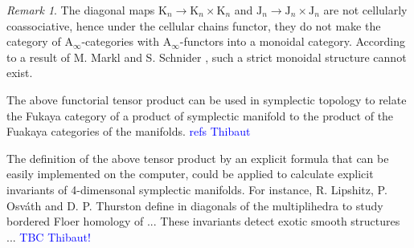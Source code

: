 \documentclass[twoside, 12pt]{amsart}
\theoremstyle{remark}
\newtheorem{remark}[definition]{\sc Remark}
\newcommand{\K}{\mathrm{K}}
\newcommand{\J}{\mathrm{J}}
\newcommand{\TreeLa}
{\vcenter{\hbox{
\begin{tikzpicture}[scale=0.25]
\draw[very thick, MidnightBlue] (0,-0.5)--(0,0) -- (-2,2)--(-2,2.5);
\draw[very thick, MidnightBlue] (-1,1)--(0,2)--(0,2.5) ;
\draw[very thick, MidnightBlue] (0,0)--(1,1)--(1,2.5) ;
%
\draw[very thick, BrickRed] (0,-0.5)--(0,-1) ;
%
\draw (-0.5,-0.5) --(0.5, -0.5);
\end{tikzpicture}}}}
\newcommand{\TreeLb}
{\vcenter{\hbox{
\begin{tikzpicture}[scale=0.25]
\draw[very thick, MidnightBlue] (-0.5,0.5)--(-2,2)--(-2,2.5);
\draw[very thick, MidnightBlue] (-1,1)--(0,2)--(0,2.5) ;
\draw[very thick, MidnightBlue] (0.5,0.5)--(1,1)--(1,2.5) ;
%
\draw[very thick, BrickRed] (0,0)--(0,-0.5) ;
\draw[very thick, BrickRed] (0,0)--(-0.5, 0.5) ;
\draw[very thick, BrickRed] (0,0)--(0.5,0.5) ;
%
\draw (-1,0.5) --(1, 0.5);
\end{tikzpicture}}}}
\newcommand{\TreeLc}
{\vcenter{\hbox{
\begin{tikzpicture}[scale=0.25]
\draw[very thick, MidnightBlue] (-2, 2.5)--(-2, 3) ;
\draw[very thick, MidnightBlue] (0, 2.5)--(0, 3) ;
\draw[very thick, MidnightBlue] (1, 2.5)--(1, 3) ;
%
\draw[very thick, BrickRed] (0,-0.5)--(0,0) -- (-2,2)--(-2,2.5);
\draw[very thick, BrickRed] (-1,1)--(0,2)--(0,2.5) ;
\draw[very thick, BrickRed] (0,0)--(1,1)--(1,2.5) ;
%
\draw (-2.5,2.5) --(1.5, 2.5);
\end{tikzpicture}}}}
\newcommand{\TreeRa}
{\vcenter{\hbox{
\begin{tikzpicture}[scale=0.25]
\draw[very thick, MidnightBlue] (0,-0.5)--(0,0) -- (2,2)--(2,2.5);
\draw[very thick, MidnightBlue] (1,1)--(0,2)--(0,2.5) ;
\draw[very thick, MidnightBlue] (0,0)--(-1,1)--(-1,2.5) ;
%
\draw[very thick, BrickRed] (0,-0.5)--(0,-1) ;
%
\draw (-0.5,-0.5) --(0.5, -0.5);
\end{tikzpicture}}}}
\newcommand{\TreeRb}
{\vcenter{\hbox{
\begin{tikzpicture}[scale=0.25]
\draw[very thick, MidnightBlue] (0.5,0.5) -- (2,2)--(2,2.5);
\draw[very thick, MidnightBlue] (1,1)--(0,2)--(0,2.5) ;
\draw[very thick, MidnightBlue] (-0.5,0.5)--(-1,1)--(-1,2.5) ;
%
\draw[very thick, BrickRed] (0,-0.5)--(0,0) ;
\draw[very thick, BrickRed] (0,0)--(0.5,0.5) ;
\draw[very thick, BrickRed] (0,0)--(-0.5,0.5) ;
%
\draw (-1,0.5) --(1, 0.5);
\end{tikzpicture}}}}
\newcommand{\TreeRc}
{\vcenter{\hbox{
\begin{tikzpicture}[scale=0.25]
\draw[very thick, BrickRed] (0,-0.5)--(0,0) -- (2,2)--(2,2.5);
\draw[very thick, BrickRed] (1,1)--(0,2)--(0,2.5) ;
\draw[very thick, BrickRed] (0,0)--(-1,1)--(-1,2.5) ;
%
\draw[very thick, MidnightBlue] (2,2.5)--(2,3) ;
\draw[very thick, MidnightBlue] (0,2.5)--(0,3) ;
\draw[very thick, MidnightBlue] (-1,2.5)--(-1,3) ;
%
\draw (-1.5,2.5) --(2.5, 2.5);
\end{tikzpicture}}}}
\newcommand{\TreeLab}
{\vcenter{\hbox{
\begin{tikzpicture}[scale=0.25]
\draw[very thick, MidnightBlue] (0,0) -- (-2,2)--(-2,2.5);
\draw[very thick, MidnightBlue] (-1,1)--(0,2)--(0,2.5) ;
\draw[very thick, MidnightBlue] (0,0)--(1,1)--(1,2.5) ;
%
\draw[very thick, BrickRed] (0,0)--(0,-0.5) ;
%
\draw (-0.5,0) --(0.5, 0);
\end{tikzpicture}}}}
\newcommand{\TreeLbc}
{\vcenter{\hbox{
\begin{tikzpicture}[scale=0.25]
\draw[very thick, MidnightBlue] (-1,1) -- (-2,2)--(-2,2.5);
\draw[very thick, MidnightBlue] (-1,1)--(0,2)--(0,2.5) ;
\draw[very thick, MidnightBlue] (1,1)--(1,2.5) ;
%
\draw[very thick, BrickRed] (0,-0.5)--(0,0) ;
\draw[very thick, BrickRed] (0,0)--(-1,1) ;
\draw[very thick, BrickRed] (0,0)--(1,1) ;
%
\draw (-1.5,1) --(1.5, 1);
\end{tikzpicture}}}}
\newcommand{\TreeRab}
{\vcenter{\hbox{
\begin{tikzpicture}[scale=0.25]
\draw[very thick, MidnightBlue] (0,0) -- (2,2)--(2,2.5);
\draw[very thick, MidnightBlue] (1,1)--(0,2)--(0,2.5) ;
\draw[very thick, MidnightBlue] (0,0)--(-1,1)--(-1,2.5) ;
%
\draw[very thick, BrickRed] (0,-0.5)--(0,0) ;
%
\draw (-0.5,0) --(0.5, 0);
\end{tikzpicture}}}}
\newcommand{\TreeRbc}
{\vcenter{\hbox{
\begin{tikzpicture}[scale=0.25]
\draw[very thick, MidnightBlue] (1,1) -- (2,2)--(2,2.5);
\draw[very thick, MidnightBlue] (1,1)--(0,2)--(0,2.5) ;
\draw[very thick, MidnightBlue] (-1,1)--(-1,2.5) ;
%
\draw[very thick, BrickRed] (0,-0.5)--(0,0) ;
\draw[very thick, BrickRed] (0,0)--(1,1) ;
\draw[very thick, BrickRed] (0,0)--(-1,1) ;
%
\draw (-1.5,1) --(1.5, 1);
\end{tikzpicture}}}}
\newcommand{\TreeCa}
{\vcenter{\hbox{
\begin{tikzpicture}[scale=0.25]
\draw[very thick, MidnightBlue] (0,-0.5) -- (0,1.5);
\draw[very thick, MidnightBlue] (0,0) -- (-1,1)--(-1,1.5);
\draw[very thick, MidnightBlue] (0,0) -- (1,1)--(1,1.5);
%
\draw[very thick, BrickRed] (0,-0.5)--(0,-1) ;
%
\draw (-0.5,-0.5) --(0.5, -0.5);
\end{tikzpicture}}}}
\newcommand{\TreeCb}
{\vcenter{\hbox{
\begin{tikzpicture}[scale=0.25]
\draw[very thick, MidnightBlue] (0,-0.5) -- (0,1.5);
\draw[very thick, MidnightBlue] (0,0) -- (-1,1)--(-1,1.5);
\draw[very thick, MidnightBlue] (0,0) -- (1,1)--(1,1.5);
%
\draw[very thick, BrickRed] (-1,1.5)--(-1,2) ;
\draw[very thick, BrickRed] (0,1.5)--(0,2) ;
\draw[very thick, BrickRed] (1,1.5)--(1,2) ;
%
\draw (-1.5,1.5) --(1.5, 1.5);
\end{tikzpicture}}}}
\newcommand{\TreeCab}
{\vcenter{\hbox{
\begin{tikzpicture}[scale=0.25]
\draw[very thick, MidnightBlue] (0,0) -- (0,1.5);
\draw[very thick, MidnightBlue] (0,0) -- (-1,1)--(-1,1.5);
\draw[very thick, MidnightBlue] (0,0) -- (1,1)--(1,1.5);
%
\draw[very thick, BrickRed] (0,-0.5)--(0,0) ;
%
\draw (-0.5,0) --(0.5, 0);
\end{tikzpicture}}}}
\newcommand{\TreeIab}
{\vcenter{\hbox{
\begin{tikzpicture}[scale=0.35]
\draw[very thick, MidnightBlue] (0,0.5)--(0,0);
%
\draw[very thick, BrickRed] (0,-0.5)--(0,0) ;
%
\draw (-0.25,0) --(0.25, 0);
\end{tikzpicture}}}}
\newcommand{\TreeR}
{\vcenter{\hbox{
\begin{tikzpicture}[yscale=0.2,xscale=0.2]
\draw[thick] (0,-1)--(0,0) -- (2,2);
\draw[thick] (1,1)--(0,2) ;
\draw[thick] (0,0)--(-1,1) ;
\draw [fill] (0,-1) circle [radius=0.035];
\draw [fill] (2,2) circle [radius=0.035];
\draw [fill] (0,2) circle [radius=0.035];
\draw [fill] (-1,1) circle [radius=0.035];
\end{tikzpicture}}}}
\newcommand{\TreeL}
{\vcenter{\hbox{
\begin{tikzpicture}[yscale=0.2,xscale=0.2]
\draw[thick] (0,-1)--(0,0) -- (-2,2);
\draw[thick] (-1,1)--(0,2) ;
\draw[thick] (0,0)--(1,1) ;
\draw [fill] (0,-1) circle [radius=0.035];
\draw [fill] (-2,2) circle [radius=0.035];
\draw [fill] (0,2) circle [radius=0.035];
\draw [fill] (1,1) circle [radius=0.035];
\end{tikzpicture}}}}
\newcommand{\TreeLL}
{\vcenter{\hbox{
\begin{tikzpicture}[yscale=0.2,xscale=0.2]
\draw[thick] (0,-1)--(0,0) -- (-3,3);
\draw[thick] (-1,1)--(0,2) ;
\draw[thick] (-2,2)--(-1,3) ;
\draw[thick] (0,0)--(1,1) ;
\draw [fill] (0,-1) circle [radius=0.035];
\draw [fill] (-2,2) circle [radius=0.035];
\draw [fill] (0,2) circle [radius=0.035];
\draw [fill] (1,1) circle [radius=0.035];
\draw [fill] (-3,3) circle [radius=0.035];
\draw [fill] (-1,3) circle [radius=0.035];
\end{tikzpicture}}}}
\newcommand{\TreeLR}
{\vcenter{\hbox{
\begin{tikzpicture}[yscale=0.2,xscale=0.2]
\draw[thick] (0,-1)--(0,0) -- (-2,2);
\draw[thick] (-1,1)--(1,3) ;
\draw[thick] (0,0)--(1,1) ;
\draw[thick] (0,2)--(-1,3) ;
\draw [fill] (0,-1) circle [radius=0.035];
\draw [fill] (-2,2) circle [radius=0.035];
\draw [fill] (0,2) circle [radius=0.035];
\draw [fill] (1,1) circle [radius=0.035];
\draw [fill] (-1,3) circle [radius=0.035];
\draw [fill] (1,3) circle [radius=0.035];
\end{tikzpicture}}}}
\newcommand{\TreeRR}
{\vcenter{\hbox{
\begin{tikzpicture}[yscale=0.2,xscale=0.2]
\draw[thick] (0,-1)--(0,0) -- (3,3);
\draw[thick] (1,1)--(0,2) ;
\draw[thick] (2,2)--(1,3) ;
\draw[thick] (0,0)--(-1,1) ;
\draw [fill] (0,-1) circle [radius=0.035];
\draw [fill] (2,2) circle [radius=0.035];
\draw [fill] (0,2) circle [radius=0.035];
\draw [fill] (-1,1) circle [radius=0.035];
\draw [fill] (3,3) circle [radius=0.035];
\draw [fill] (1,3) circle [radius=0.035];
\end{tikzpicture}}}}
\newcommand{\TreeRL}
{\vcenter{\hbox{
\begin{tikzpicture}[yscale=0.2,xscale=0.2]
\draw[thick] (0,-1)--(0,0) -- (2,2);
\draw[thick] (1,1)--(-1,3) ;
\draw[thick] (0,0)--(-1,1) ;
\draw[thick] (0,2)--(1,3) ;
\draw [fill] (0,-1) circle [radius=0.035];
\draw [fill] (2,2) circle [radius=0.035];
\draw [fill] (0,2) circle [radius=0.035];
\draw [fill] (-1,1) circle [radius=0.035];
\draw [fill] (1,3) circle [radius=0.035];
\draw [fill] (-1,3) circle [radius=0.035];
\end{tikzpicture}}}}
\newcommand{\TreeCC}
{\vcenter{\hbox{
\begin{tikzpicture}[yscale=0.2,xscale=0.2]
\draw[thick] (0,-1)--(0,0) -- (-2.5,2.5);
\draw[thick] (-1.5,1.5)--(-0.5,2.5) ;
\draw[thick] (1.5,1.5)--(0.5,2.5) ;
\draw[thick] (0,0)--(2.5,2.5) ;
\draw [fill] (0,-1) circle [radius=0.035];
\draw [fill] (-2.5,2.5) circle [radius=0.035];
\draw [fill] (-0.5,2.5) circle [radius=0.035];
\draw [fill] (0.5,2.5) circle [radius=0.035];
\draw [fill] (2.5,2.5) circle [radius=0.035];
\end{tikzpicture}}}}
\newcommand{\TreeAL}
{\vcenter{\hbox{
\begin{tikzpicture}[yscale=0.2,xscale=0.2]
\draw[thick] (0,-1)--(0,0) -- (-2,2);
\draw[thick] (-1,1)--(0,2) ;
\draw[thick] (0,0)--(1,1) ;
\draw[thick] (-1,1)--(-1,2) ;
\draw [fill] (0,-1) circle [radius=0.035];
\draw [fill] (-2,2) circle [radius=0.035];
\draw [fill] (0,2) circle [radius=0.035];
\draw [fill] (1,1) circle [radius=0.035];
\draw [fill] (-1,2) circle [radius=0.035];
\end{tikzpicture}}}}
\newcommand{\TreeRA}
{\vcenter{\hbox{
\begin{tikzpicture}[yscale=0.2,xscale=0.2]
\draw[thick] (0,-1)--(0,0) -- (2,2);
\draw[thick] (1,1)--(0,2) ;
\draw[thick] (0,0)--(-1,1) ;
\draw[thick] (1,1)--(1,2) ;
\draw [fill] (0,-1) circle [radius=0.035];
\draw [fill] (2,2) circle [radius=0.035];
\draw [fill] (0,2) circle [radius=0.035];
\draw [fill] (-1,1) circle [radius=0.035];
\draw [fill] (1,2) circle [radius=0.035];
\end{tikzpicture}}}}
\newcommand{\TreeAR}
{\vcenter{\hbox{
\begin{tikzpicture}[yscale=0.2,xscale=0.2]
\draw[thick] (0,-1)--(0,0) -- (2,2);
\draw[thick] (1,1)--(0,2) ;
\draw[thick] (0,0)--(-1,1) ;
\draw[thick] (0,0)--(0,1) ;
\draw [fill] (0,-1) circle [radius=0.035];
\draw [fill] (2,2) circle [radius=0.035];
\draw [fill] (0,2) circle [radius=0.035];
\draw [fill] (-1,1) circle [radius=0.035];
\draw [fill] (0,1) circle [radius=0.035];
\end{tikzpicture}}}}
\newcommand{\TreeLA}
{\vcenter{\hbox{
\begin{tikzpicture}[yscale=0.2,xscale=0.2]
\draw[thick] (0,-1)--(0,0) -- (-2,2);
\draw[thick] (-1,1)--(0,2) ;
\draw[thick] (0,0)--(1,1) ;
\draw[thick] (0,0)--(0,1) ;
\draw [fill] (0,-1) circle [radius=0.035];
\draw [fill] (-2,2) circle [radius=0.035];
\draw [fill] (0,2) circle [radius=0.035];
\draw [fill] (1,1) circle [radius=0.035];
\draw [fill] (0,1) circle [radius=0.035];
\end{tikzpicture}}}}
\newcommand{\TreeCA}
{\vcenter{\hbox{
\begin{tikzpicture}[yscale=0.2,xscale=0.2]
\draw[thick] (0,-1)--(0,0) -- (-1,1);
\draw[thick] (0,1.5)--(1,2.5) ;
\draw[thick] (0,1.5)--(-1,2.5) ;
\draw[thick] (0,0)--(1,1) ;
\draw[thick] (0,0)--(0,1.5) ;
\draw [fill] (0,-1) circle [radius=0.035];
\draw [fill] (-1,1) circle [radius=0.035];
\draw [fill] (1,2.5) circle [radius=0.035];
\draw [fill] (-1,2.5) circle [radius=0.035];
\draw [fill] (1,1) circle [radius=0.035];
\draw [fill] (0,1) circle [radius=0.035];
\end{tikzpicture}}}}
\newcommand{\TreeC}
{\vcenter{\hbox{
\begin{tikzpicture}[yscale=0.2,xscale=0.2]
\draw[thick] (0,-1.5)--(0,0);
\draw[thick] (0,0)--(1.5,1.5) ;
\draw[thick] (0,0)--(0.5,1.5) ;
\draw[thick] (0,0)--(-0.5,1.5) ;
\draw[thick] (0,0)--(-1.5,1.5) ;
\draw [fill] (0,-1.5) circle [radius=0.035];
\draw [fill] (1.5,1.5) circle [radius=0.035];
\draw [fill] (0.5,1.5) circle [radius=0.035];
\draw [fill] (-1.5,1.5) circle [radius=0.035];
\draw [fill] (-0.5,1.5) circle [radius=0.035];
\end{tikzpicture}}}}
\newcommand{\Guillaume}[1]{\textcolor{blue}{#1}}
\begin{document}
\begin{remark} 
  The diagonal maps $\K_n \to \K_n \times \K_n$ and $\J_n \to \J_n \times \J_n$ are not cellularly coassociative, hence under the cellular chains functor, they do not make the category of $\mathrm{A}_\infty$-categories with $\mathrm{A}_\infty$-functors into a monoidal category. 
  According to a result of M. Markl and S. Schnider \cite[Section 6]{MarklShnider06}, such a strict monoidal structure cannot exist. 
\end{remark}

The above functorial tensor product can be used in symplectic topology to relate the Fukaya category of a product of symplectic manifold to the product of the Fuakaya categories of the manifolds. \Guillaume{refs Thibaut}

The definition of the above tensor product by an explicit formula that can be easily implemented on the computer, could be applied to calculate explicit invariants of 4-dimensonal symplectic manifolds. For instance, R. Lipshitz, P. Osv\'ath and D. P. Thurston define in \cite{LOT20} diagonals of the multiplihedra to study bordered Floer homology of ... These invariants detect exotic smooth structures ... \Guillaume{TBC Thibaut!}











\end{document}
